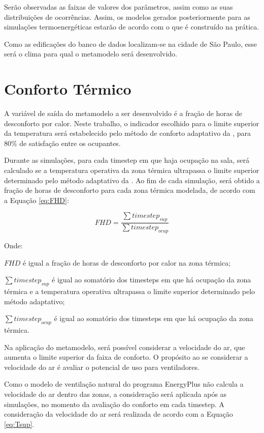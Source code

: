 \documentclass[brazil,hardcopy,openany,a5paper]{ufscthesis}
\begin{document}
		Serão observadas as faixas de valores dos parâmetros, assim como as suas distribuições de ocorrências. Assim, os modelos gerados posteriormente para as simulações termoenergéticas estarão de acordo com o que é construído na prática.
		
		Como as edificações do banco de dados localizam-se na cidade de São Paulo, esse será o clima para qual o metamodelo será desenvolvido.
		
		\section{Conforto Térmico}
		
		A variável de saída do metamodelo a ser desenvolvido é a fração de horas de desconforto por calor. Neste trabalho, o indicador escolhido para o limite superior da temperatura será estabelecido pelo método de conforto adaptativo da  \cite{ASHRAEStandard552017}, para 80\% de satisfação entre os ocupantes.

		Durante as simulações, para cada timestep em que haja ocupação na sala, será calculado se a temperatura operativa da zona térmica ultrapassa o limite superior determinado pelo método adaptativo da  \cite{ASHRAEStandard552017}. Ao fim de cada simulação, será obtido a fração de horas de desconforto para cada zona térmica modelada, de acordo com a Equação \ref{eq:FHD}:
		
		\begin{equation}
		\label{eq:FHD}
		FHD = \frac{\sum{timestep_{sup}}}{\sum{timestep_{ocup}}}
		\end{equation}
		
		Onde:
		
		$FHD$ é igual a fração de horas de desconforto por calor na zona térmica;
		
		$\sum{timestep_{sup}}$ é igual ao somatório dos timesteps em que há ocupação da zona térmica e a temperatura operativa ultrapassa o limite superior determinado pelo método adaptativo;
		
		$\sum{timestep_{ocup}}$ é igual ao somatório dos timesteps em que há ocupação da zona térmica.
		
		Na aplicação do metamodelo, será possível considerar a velocidade do ar, que aumenta o limite superior da faixa de conforto. O propósito ao se considerar a velocidade do ar é avaliar o potencial de uso para ventiladores.		
		
		Como o modelo de ventilação natural do programa EnergyPlus não calcula a velocidade do ar dentro das zonas, a consideração será aplicada após as simulações, no momento da avaliação do conforto em cada timestep. A consideração da velocidade do ar será realizada de acordo com a Equação \ref{eq:Tsup}.
		
\end{document}
